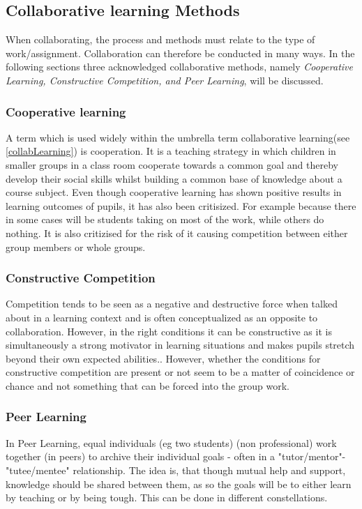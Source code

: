 \subsection{Collaborative learning Methods} 
When collaborating, the process and methods must relate to the type of work/assignment. Collaboration can therefore be conducted in many ways. In the following sections three acknowledged collaborative methods, namely \textit{ Cooperative Learning, Constructive Competition, and Peer Learning}, will be discussed.  

\subsubsection{Cooperative learning}
A term which is used widely within the umbrella term collaborative learning(see \autoref{collabLearning}) is cooperation\cite{collaborationCooperation}. It is a teaching strategy in which children in smaller groups in a class room cooperate towards a common goal and thereby develop their social skills whilst building a common base of knowledge about a course subject\cite{collaborativeLearningTeachers}\cite[p.~15]{peerLearning}\cite{collaborationCompetition}. Even though cooperative learning has shown positive results in learning outcomes of pupils, it has also been critisized. For example because there in some cases will be students taking on most of the work, while others do nothing. It is also critizised for the risk of it causing competition between either group members or whole groups\cite{collaborationCooperation}.

\subsubsection{Constructive Competition}
Competition tends to be seen as a negative and destructive force when talked about in a learning context and is often conceptualized as an opposite to collaboration. However, in the right conditions it can be constructive as it is simultaneously a strong motivator in learning situations and makes pupils stretch beyond their own expected abilities.\cite{collaborationCompetition}. However, whether the conditions for constructive competition are present or not seem to be a matter of coincidence or chance and not something that can be forced into the group work\cite{collaborationCompetition}.

\subsubsection{Peer Learning} %
In Peer Learning, equal individuals (eg two students) (non professional) work together (in peers) to archive their individual goals \cite{peerLearning} - often in a "tutor/mentor"-"tutee/mentee" relationship. The idea is, that though mutual help and support, knowledge should be shared between them, as so the goals will be to either learn by teaching or by being tough. This can be done in different constellations\cite{collaborationCompetition}.

